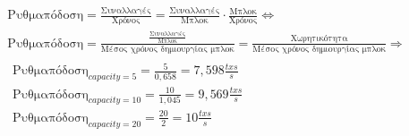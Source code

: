 \documentclass{article}
\newcommand{\eng}[1]{\foreignlanguage{english}{#1}} %
\begin{document}
\begin{equation}
    \begin{gathered}
        \text{Ρυθμαπόδοση} = \frac{\text{Συναλλαγές}}{\text{Χρόνος}} = \frac{\text{Συναλλαγές}}{\text{Μπλοκ}}\cdot \frac{\text{Μπλοκ}}{\text{Χρόνος}} \Leftrightarrow \\
        \text{Ρυθμαπόδοση} = \frac{\frac{\text{Συναλλαγές}}{\text{Μπλοκ}} }{\text{Μέσος χρόνος δημιουργίας μπλοκ}} = \frac{\text{Χωρητικότητα}}{\text{Μέσος χρόνος δημιουργίας μπλοκ}} \Rightarrow \\
    \boxed{
        \begin{gathered}
            \text{Ρυθμαπόδοση}_{capacity=5} = \frac{5}{0,658} = 7,598 \text{} \frac{txs}{s}\\
            \text{Ρυθμαπόδοση}_{capacity=10} = \frac{10}{1,045} = 9,569 \text{} \frac{txs}{s}\\
            \text{Ρυθμαπόδοση}_{capacity=20} = \frac{20}{2} = 10 \text{} \frac{txs}{s}\\
        \end{gathered}
    }
    \end{gathered}
\end{equation}

% 
%             
%             
%             
\end{document}
